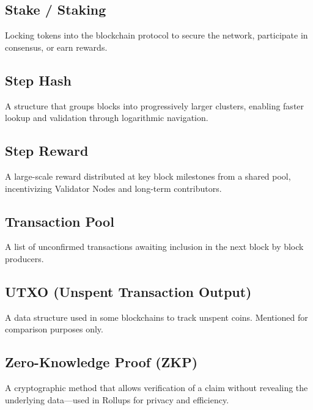 \documentclass{article}
\begin{document}
\subsection*{Stake / Staking}
Locking tokens into the blockchain protocol to secure the network, participate in consensus, or earn rewards.

\subsection*{Step Hash}
A structure that groups blocks into progressively larger clusters, enabling faster lookup and validation through logarithmic navigation.

\subsection*{Step Reward}
A large-scale reward distributed at key block milestones from a shared pool, incentivizing Validator Nodes and long-term contributors.

\subsection*{Transaction Pool}
A list of unconfirmed transactions awaiting inclusion in the next block by block producers.

\subsection*{UTXO (Unspent Transaction Output)}
A data structure used in some blockchains to track unspent coins. Mentioned for comparison purposes only.

\subsection*{Zero-Knowledge Proof (ZKP)}
A cryptographic method that allows verification of a claim without revealing the underlying data—used in Rollups for privacy and efficiency.
\end{document}
